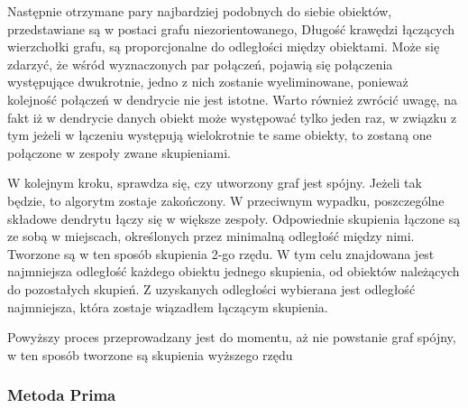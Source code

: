 \documentclass[12pt,a4paper]{report}
\begin{document}
Następnie otrzymane pary najbardziej podobnych do siebie obiektów, przedstawiane są w postaci grafu niezorientowanego, Długość krawędzi łączących wierzchołki grafu, są proporcjonalne do odległości między obiektami. Może się zdarzyć, że wśród wyznaczonych par połączeń, pojawią się połączenia występujące dwukrotnie, jedno z nich zostanie wyeliminowane, ponieważ kolejność połączeń w dendrycie nie jest istotne. Warto również zwrócić uwagę, na fakt iż w dendrycie danych obiekt może występować tylko jeden raz, w związku z tym jeżeli w łączeniu występują wielokrotnie te same obiekty, to zostaną one połączone w zespoły zwane skupieniami. 

W kolejnym kroku, sprawdza się, czy utworzony graf jest spójny. Jeżeli tak będzie, to algorytm zostaje zakończony. W przeciwnym wypadku, poszczególne składowe dendrytu łączy się w większe zespoły. Odpowiednie skupienia łączone są ze sobą w miejscach, określonych przez minimalną odległość między nimi. Tworzone są w ten sposób skupienia 2-go rzędu. W tym celu znajdowana jest najmniejsza odległość każdego obiektu jednego skupienia, od obiektów należących do pozostałych skupień. Z uzyskanych odległości wybierana jest odległość najmniejsza, która zostaje wiązadłem łączącym skupienia. 

Powyższy proces przeprowadzany jest do momentu, aż nie powstanie graf spójny, w ten sposób tworzone są skupienia wyższego rzędu 

\subsubsection{Metoda Prima}
\noindent
\end{document}
